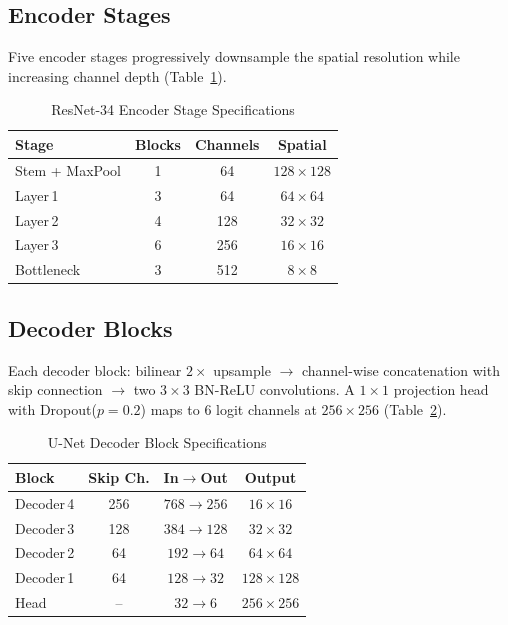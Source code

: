 \documentclass[10pt,conference]{IEEEtran}
\begin{document}
\subsection{Encoder Stages}

Five encoder stages progressively downsample the spatial resolution while
increasing channel depth (Table~\ref{tab:encoder}).

\begin{table}[!t]
  \caption{ResNet-34 Encoder Stage Specifications}
  \label{tab:encoder}
  \centering
  \small
  \begin{tabular}{l c c c}
    \toprule
    \textbf{Stage} & \textbf{Blocks} & \textbf{Channels} & \textbf{Spatial} \\
    \midrule
    Stem + MaxPool  & 1 & 64  & $128{\times}128$ \\
    Layer\,1        & 3 & 64  & $64{\times}64$   \\
    Layer\,2        & 4 & 128 & $32{\times}32$   \\
    Layer\,3        & 6 & 256 & $16{\times}16$   \\
    Bottleneck      & 3 & 512 & $8{\times}8$     \\
    \bottomrule
  \end{tabular}
\end{table}

\subsection{Decoder Blocks}

Each decoder block: bilinear $2{\times}$ upsample $\to$ channel-wise concatenation
with skip connection $\to$ two $3{\times}3$ BN-ReLU convolutions. A
$1{\times}1$ projection head with Dropout($p{=}0.2$) maps to 6 logit channels
at $256{\times}256$ (Table~\ref{tab:decoder}).

\begin{table}[!t]
  \caption{U-Net Decoder Block Specifications}
  \label{tab:decoder}
  \centering
  \small
  \begin{tabular}{l c c c}
    \toprule
    \textbf{Block} & \textbf{Skip Ch.} & \textbf{In$\!\to\!$Out} & \textbf{Output} \\
    \midrule
    Decoder\,4 & 256 & $768\to256$ & $16{\times}16$   \\
    Decoder\,3 & 128 & $384\to128$ & $32{\times}32$   \\
    Decoder\,2 & 64  & $192\to64$  & $64{\times}64$   \\
    Decoder\,1 & 64  & $128\to32$  & $128{\times}128$ \\
    Head       & --  & $32\to6$    & $256{\times}256$ \\
    \bottomrule
  \end{tabular}
\end{table}
\end{document}
